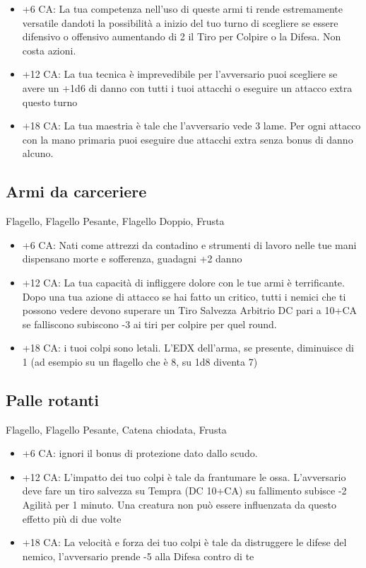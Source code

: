\documentclass[a4paper,11pt,twoside,openany]{book}
\begin{document}
\begin{itemize}
	\item +6 CA: La tua competenza nell'uso di queste armi ti rende estremamente versatile dandoti la possibilità a inizio del tuo turno di scegliere se essere difensivo o offensivo aumentando di 2 il Tiro per Colpire o la Difesa. Non costa azioni.

	\item +12 CA: La tua tecnica è imprevedibile per l'avversario puoi scegliere se avere un +1d6 di danno con tutti i tuoi attacchi o eseguire un attacco extra questo turno

	\item +18 CA: La tua maestria è tale che l'avversario vede 3 lame. Per ogni attacco con la mano primaria puoi eseguire due attacchi extra senza bonus di danno alcuno.
\end{itemize}

\subsection{Armi da carceriere}  Flagello, Flagello Pesante, Flagello Doppio, Frusta

\begin{itemize}
	\item +6 CA: Nati come attrezzi da contadino e strumenti di lavoro nelle tue mani dispensano morte e sofferenza, guadagni +2 danno

	\item +12 CA: La tua capacità di infliggere dolore con le tue armi è terrificante. Dopo una tua azione di attacco se hai fatto un critico, tutti i nemici che ti possono vedere devono superare un Tiro Salvezza Arbitrio DC pari a 10+CA se falliscono subiscono -3 ai tiri per colpire per quel round.

	\item +18 CA: i tuoi colpi sono letali. L'EDX dell'arma, se presente, diminuisce di 1 (ad esempio su un flagello che è 8, su 1d8 diventa 7)
\end{itemize}

\subsection{Palle rotanti} Flagello, Flagello Pesante, Catena chiodata, Frusta

\begin{itemize}
	\item +6 CA: ignori il bonus di protezione dato dallo scudo.

	\item +12 CA: L'impatto dei tuo colpi è tale da frantumare le ossa. L'avversario deve fare un tiro salvezza su Tempra (DC 10+CA) su fallimento subisce -2 Agilità per 1 minuto. Una creatura non può essere influenzata da questo effetto più di due volte

	\item +18 CA: La velocità e forza dei tuo colpi è tale da distruggere le difese del nemico, l'avversario prende -5 alla Difesa contro di te
\end{itemize}
\end{document}
